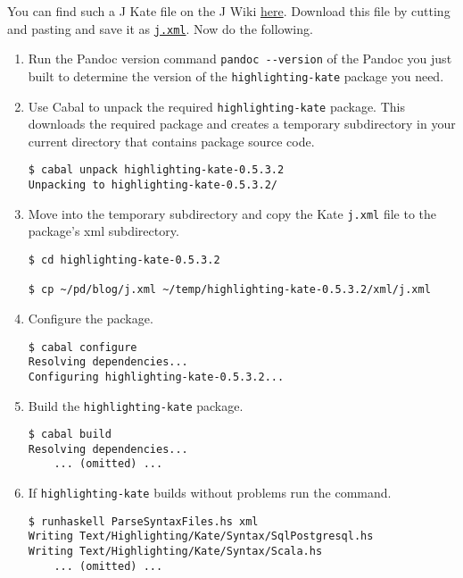 \documentclass[]{article}
\begin{document}
You can find such a J Kate file on the J Wiki
\href{http://www.jsoftware.com/jwiki/Guides/Syntax\%20Coloring?action=AttachFile\&do=view\&target=j.xml.txt}{here}.
Download this file by cutting and pasting and save it as
\href{https://www.box.com/s/wvms2a1ws3il81kyb1qo}{\texttt{j.xml}}. Now
do the following.

\begin{enumerate}[1.]
\item
  Run the Pandoc version command \texttt{pandoc -{}-version} of the
  Pandoc you just built to determine the version of the
  \texttt{highlighting-kate} package you need.
\item
  Use Cabal to unpack the required \texttt{highlighting-kate} package.
  This downloads the required package and creates a temporary
  subdirectory in your current directory that contains package source
  code.

\begin{verbatim}
$ cabal unpack highlighting-kate-0.5.3.2
Unpacking to highlighting-kate-0.5.3.2/
\end{verbatim}
\item
  Move into the temporary subdirectory and copy the Kate \texttt{j.xml}
  file to the package's xml subdirectory.

\begin{verbatim}
$ cd highlighting-kate-0.5.3.2

$ cp ~/pd/blog/j.xml ~/temp/highlighting-kate-0.5.3.2/xml/j.xml
\end{verbatim}
\item
  Configure the package.

\begin{verbatim}
$ cabal configure
Resolving dependencies...
Configuring highlighting-kate-0.5.3.2...
\end{verbatim}
\item
  Build the \texttt{highlighting-kate} package.

\begin{verbatim}
$ cabal build
Resolving dependencies...
    ... (omitted) ...
\end{verbatim}
\item
  If \texttt{highlighting-kate} builds without problems run the command.

\begin{verbatim}
$ runhaskell ParseSyntaxFiles.hs xml
Writing Text/Highlighting/Kate/Syntax/SqlPostgresql.hs
Writing Text/Highlighting/Kate/Syntax/Scala.hs
    ... (omitted) ...
\end{verbatim}


\end{enumerate}
\end{document}
